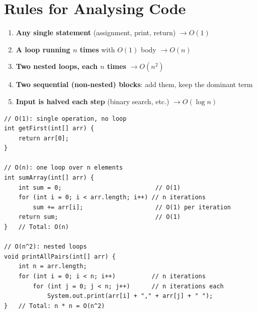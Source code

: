 \documentclass[12pt,a4paper,oneside]{book}
\begin{document}
\begin{center}
\end{center}

\section{Rules for Analysing Code}

\begin{enumerate}
  \item \textbf{Any single statement} (assignment, print, return) $\to O(1)$
  \item \textbf{A loop running $n$ times} with $O(1)$ body $\to O(n)$
  \item \textbf{Two nested loops, each $n$ times} $\to O(n^2)$
  \item \textbf{Two sequential (non-nested) blocks}: add them, keep the dominant term
  \item \textbf{Input is halved each step} (binary search, etc.) $\to O(\log n)$
\end{enumerate}

\begin{lstlisting}[caption={Identifying complexity from code structure}]
// O(1): single operation, no loop
int getFirst(int[] arr) {
    return arr[0];
}

// O(n): one loop over n elements
int sumArray(int[] arr) {
    int sum = 0;                          // O(1)
    for (int i = 0; i < arr.length; i++) // n iterations
        sum += arr[i];                    // O(1) per iteration
    return sum;                           // O(1)
}   // Total: O(n)

// O(n^2): nested loops
void printAllPairs(int[] arr) {
    int n = arr.length;
    for (int i = 0; i < n; i++)          // n iterations
        for (int j = 0; j < n; j++)      // n iterations each
            System.out.print(arr[i] + "," + arr[j] + " ");
}   // Total: n * n = O(n^2)
\end{lstlisting}
\end{document}
